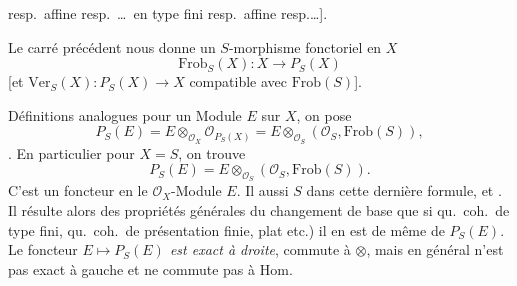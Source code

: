 \documentclass[11pt,a4paper]{article}
\begin{document}

resp.\ affine resp.\ \ldots\ en type fini resp.\ affine resp.\ldots].



Le carré précédent nous donne un $S$-morphisme fonctoriel en $X$
\[
  \mathrm{Frob}_S(X) : X \longrightarrow P_S(X)
\]
[et $\mathrm{Ver}_S(X) : P_S(X) \to X$ compatible avec $\mathrm{Frob}(S)$].

Définitions analogues pour un Module $E$ sur $X$, on pose
\[
  P_S(E) = E \otimes_{\mathcal{O}_X} \mathcal{O}_{P_S(X)}
  = E \otimes_{\mathcal{O}_S} (\mathcal{O}_S, \mathrm{Frob}(S)) ,
\]
. En particulier pour $X = S$, on trouve
\[
  P_S(E) = E \otimes_{\mathcal{O}_S} (\mathcal{O}_S, \mathrm{Frob}(S)) .
\]
C'est un foncteur \ill{} en le $\mathcal{O}_X$-Module $E$.
 \struck{\ill{}} Il
 aussi \ill{} \ill{} $S$ dans cette dernière formule, et \ill{}
\ill{} \ill{}. Il résulte alors des propriétés générales du
changement de base que si   \ill{} \ill{} \ill{}
qu.\ coh.\ de type fini, qu.\ coh.\ de présentation
finie, plat etc.) il en est de même de $P_S(E)$. Le foncteur
\emph{$E \mapsto P_S(E)$ est exact à droite}, commute à
$\otimes$, mais en général n'est pas exact à gauche et ne commute pas à
$\mathrm{Hom}$.

\end{document}

